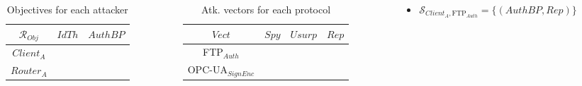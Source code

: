 \documentclass{beamer}
\newcommand{\ftpauth}{FTP$_{Auth}$\xspace}
\newcommand{\opcuasignenc}{OPC-UA$_{SignEnc}$\xspace}
\newcommand{\cmark}{{\color{green}\ding{51}}}%
\newcommand{\xmark}{}%
\begin{document}
\begin{frame}[fragile]{}
\begin{tcolorbox}[adjusted title={\centering\large Attack models}]
\begin{columns}[T]
\begin{column}{.65\textwidth}
\begin{tcolorbox}
\begin{columns}[c]
\begin{column}{.3\textwidth}
\begin{table}[htb]
\begin{tabular}{|c|c|c|}
                                    \hline
                                    $\mathcal{R}_{Obj}$ & $IdTh$   & $AuthBP$    \\
                                    \hline
                                    $Client_{A}$        & \xmark    & \cmark     \\
                                    \hline
                                    $Router_{A}$        & \cmark    & \xmark     \\
                                    \hline
                                \end{tabular}
                                \caption{Objectives for each attacker}
                                \label{tab:ex_robj}
                            \end{table}
                        \end{column}
                        \begin{column}{.3\textwidth}
                            \begin{table}[htb]
                                \centering
                                \vspace{-.25em}
                                \begin{tabular}{|c|c|c|c|}
                                    \hline
                                    $Vect$          & $Spy$     & $Usurp$   & $Rep$     \\
                                    \hline
                                    \ftpauth        & \cmark    & \xmark    & \cmark    \\
                                    \hline
                                    \opcuasignenc   & \xmark    & \xmark    & \xmark    \\
                                    \hline
                                \end{tabular}
                                \vspace{-.75em}
                                \caption{Atk. vectors for each protocol}
                                \label{tab:ex_cap}
                            \end{table}
                        \end{column}
                        \hspace{.7cm}
                        \begin{column}{.4\textwidth}
                            \begin{itemize}
                                \item $\mathcal{S}_{Client_{A},\text{\ftpauth}} = \{ (AuthBP, Rep) \}$

\end{itemize}
\end{column}
\end{columns}
\end{tcolorbox}
\end{column}
\end{columns}
\end{tcolorbox}
\end{frame}
\end{document}
